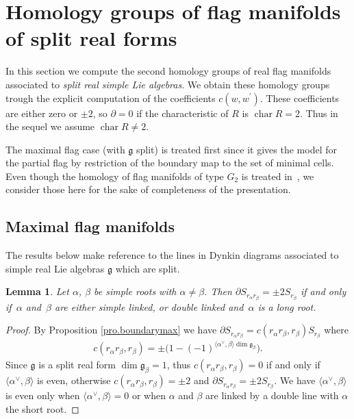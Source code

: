\documentclass[10pt,a4paper]{amsart}
\numberwithin{equation}{section}
\newtheorem{Lemma}[Theorem]{Lemma}
\begin{document}
\section{Homology groups of flag manifolds of split real forms}\label{sec.comput}

In this section we compute the second homology groups of real flag manifolds associated to \textit{split real simple Lie algebras}. We obtain these homology groups trough the explicit computation of the coefficients $c(w,w^{\prime })$. These coefficients are either zero or $\pm2$, so $\partial=0$ if the characteristic of $R$ is $\operatorname{char}R=2$. Thus in the sequel we assume $\operatorname{char}R\neq 2$.

The maximal flag case (with $\mathfrak{g}$ split) is treated first since it gives the model for the partial flag by restriction of the boundary map to the set of minimal cells. Even though the homology of flag manifolds of type $G_{2}$ is treated in~\cite{RSM}, we consider those here for the sake of completeness of the presentation.

\subsection{Maximal flag manifolds}

The results below make reference to the lines in Dynkin diagrams associated to simple real Lie algebras $\mathfrak{g}$ which are split.

\begin{Lemma}\label{lm.boundary2}Let $\alpha $, $\beta $ be simple roots with $\alpha \neq \beta $. Then $\partial S_{r_{\alpha }r_{\beta }}=\pm 2S_{r_{\beta }}$ if and only if~$\alpha $ and~$\beta $ are either simple linked, or double linked and~$\alpha $ is a long root.
\end{Lemma}

\begin{proof}By Proposition \ref{pro.boundarymax} we have $\partial S_{r_{\alpha}r_{\beta }}=c ( r_{\alpha }r_{\beta },r_{\beta } ) S_{r_{\beta }}$ where
\begin{gather}
c ( r_{\alpha }r_{\beta },r_{\beta } ) =\pm \big( 1-(-1) ^{\langle \alpha ^{\vee },\beta \rangle \dim \mathfrak{g}_{\beta}}\big). \label{eq.cabb}
\end{gather}
Since $\mathfrak{g}$ is a split real form $\dim \mathfrak{g}_{\beta }=1$, thus $c(r_{\alpha }r_{\beta },r_{\beta })=0$ if and only if $\langle \alpha^{\vee },\beta \rangle $ is even, otherwise $c(r_{\alpha }r_{\beta},r_{\beta })=\pm 2$ and $\partial S_{r_{\alpha }r_{\beta }}=\pm 2S_{r_{\beta }}$. We have $\langle \alpha ^{\vee },\beta \rangle $ is even only when $ \langle \alpha ^{\vee },\beta \rangle =0$ or when $\alpha $ and $\beta $ are linked by a double line with $\alpha $ the short root.
\end{proof}
\end{document}
